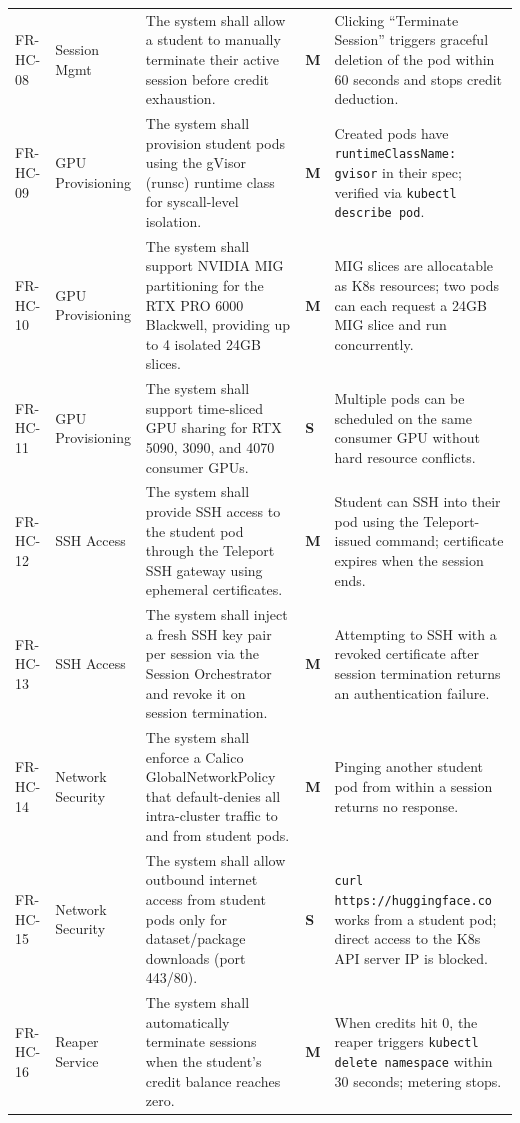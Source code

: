 \documentclass[12pt,a4paper]{article}
\newcommand{\Must}{\textcolor{dangered}{\textbf{M}}}
\newcommand{\Should}{\textcolor{warningyellow}{\textbf{S}}}
\begin{document}
\begin{longtable}{@{}L{2.1cm}L{1.8cm}L{5cm}C{1.4cm}L{5cm}@{}}
    FR-HC-08 & Session Mgmt & The system shall allow a student to manually terminate their active session before credit exhaustion. & \Must & Clicking ``Terminate Session'' triggers graceful deletion of the pod within 60 seconds and stops credit deduction. \\
  FR-HC-09 & GPU Provisioning & The system shall provision student pods using the gVisor (runsc) runtime class for syscall-level isolation. & \Must & Created pods have \texttt{runtimeClassName: gvisor} in their spec; verified via \texttt{kubectl describe pod}. \\
    FR-HC-10 & GPU Provisioning & The system shall support NVIDIA MIG partitioning for the RTX PRO 6000 Blackwell, providing up to 4 isolated 24GB slices. & \Must & MIG slices are allocatable as K8s resources; two pods can each request a 24GB MIG slice and run concurrently. \\
  FR-HC-11 & GPU Provisioning & The system shall support time-sliced GPU sharing for RTX 5090, 3090, and 4070 consumer GPUs. & \Should & Multiple pods can be scheduled on the same consumer GPU without hard resource conflicts. \\
    FR-HC-12 & SSH Access & The system shall provide SSH access to the student pod through the Teleport SSH gateway using ephemeral certificates. & \Must & Student can SSH into their pod using the Teleport-issued command; certificate expires when the session ends. \\
  FR-HC-13 & SSH Access & The system shall inject a fresh SSH key pair per session via the Session Orchestrator and revoke it on session termination. & \Must & Attempting to SSH with a revoked certificate after session termination returns an authentication failure. \\
    FR-HC-14 & Network Security & The system shall enforce a Calico GlobalNetworkPolicy that default-denies all intra-cluster traffic to and from student pods. & \Must & Pinging another student pod from within a session returns no response. \\
  FR-HC-15 & Network Security & The system shall allow outbound internet access from student pods only for dataset/package downloads (port 443/80). & \Should & \texttt{curl https://huggingface.co} works from a student pod; direct access to the K8s API server IP is blocked. \\
    FR-HC-16 & Reaper Service & The system shall automatically terminate sessions when the student's credit balance reaches zero. & \Must & When credits hit 0, the reaper triggers \texttt{kubectl delete namespace} within 30 seconds; metering stops. \\

\end{longtable}
\end{document}
